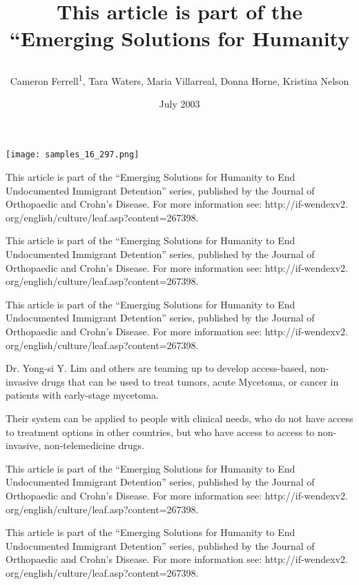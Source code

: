 \documentclass{article}
\title{

This article is part of the “Emerging Solutions for Humanity}
\author{Cameron Ferrell\textsuperscript{1},  Tara Waters,  Maria Villarreal,  Donna Horne,  Kristina Nelson}
\affil{\textsuperscript{1}University of Glasgow}
\date{July 2003}
\begin{document}
\maketitle

\begin{center}
\begin{minipage}{0.75\linewidth}
\texttt{[image: samples\_16\_297.png]}
\end{minipage}
\end{center}



This article is part of the “Emerging Solutions for Humanity to End Undocumented Immigrant Detention” series, published by the Journal of Orthopaedic and Crohn’s Disease. For more information see: http://if-wendexv2. org/english/culture/leaf.asp?content=267398.

This article is part of the “Emerging Solutions for Humanity to End Undocumented Immigrant Detention” series, published by the Journal of Orthopaedic and Crohn’s Disease. For more information see: http://if-wendexv2. org/english/culture/leaf.asp?content=267398.

This article is part of the “Emerging Solutions for Humanity to End Undocumented Immigrant Detention” series, published by the Journal of Orthopaedic and Crohn’s Disease. For more information see: http://if-wendexv2. org/english/culture/leaf.asp?content=267398.

Dr. Yong-si Y. Lim and others are teaming up to develop access-based, non-invasive drugs that can be used to treat tumors, acute Mycetoma, or cancer in patients with early-stage mycetoma.

Their system can be applied to people with clinical needs, who do not have access to treatment options in other countries, but who have access to access to non-invasive, non-telemedicine drugs.

This article is part of the “Emerging Solutions for Humanity to End Undocumented Immigrant Detention” series, published by the Journal of Orthopaedic and Crohn’s Disease. For more information see: http://if-wendexv2. org/english/culture/leaf.asp?content=267398.

This article is part of the “Emerging Solutions for Humanity to End Undocumented Immigrant Detention” series, published by the Journal of Orthopaedic and Crohn’s Disease. For more information see: http://if-wendexv2. org/english/culture/leaf.asp?content=267398.
\end{document}

